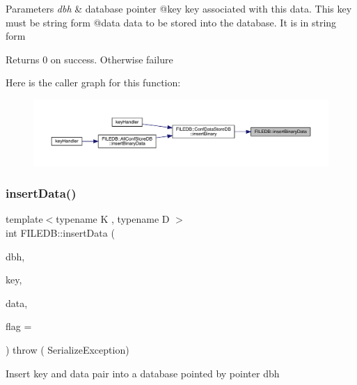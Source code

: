 \begin{DoxyParams}{Parameters}
{\em dbh} & database pointer @key key associated with this data. This key must be string form @data data to be stored into the database. It is in string form\\
\hline
\end{DoxyParams}
\begin{DoxyReturn}{Returns}
0 on success. Otherwise failure 
\end{DoxyReturn}
Here is the caller graph for this function\+:\nopagebreak
\begin{figure}[H]
\begin{center}
\leavevmode
\includegraphics[width=350pt]{d2/de6/namespaceFILEDB_a517749615adc5aa798175fb429115366_icgraph}
\end{center}
\end{figure}
\mbox{\label{namespaceFILEDB_a63f788f0f11a571f254ac8cfa8d19132}} 
\subsubsection{\texorpdfstring{insertData()}{insertData()}\hspace{0.1cm}{\footnotesize\ttfamily [1/2]}}
{\footnotesize\ttfamily template$<$typename K , typename D $>$ \\
int F\+I\+L\+E\+D\+B\+::insert\+Data (\begin{DoxyParamCaption}\item[{\mbox{\hyperlink{other__libs_2filedb_2filehash_2ffdb__db_8h_a0b27b956926453a7a8141ea8e10f0df8}{F\+F\+D\+B\+\_\+\+DB}} $\ast$}]{dbh,  }\item[{const K \&}]{key,  }\item[{const D \&}]{data,  }\item[{unsigned int}]{flag = {} }\end{DoxyParamCaption}) throw ( Serialize\+Exception) }

Insert key and data pair into a database pointed by pointer dbh


